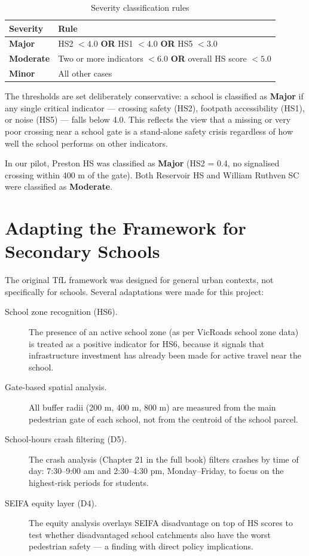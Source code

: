 \documentclass[11pt,a4paper,openany]{book}
\begin{document}
\begin{table}[H]
\centering
\caption{Severity classification rules}
\begin{tabular}{L{2.5cm}L{9cm}}
\toprule
\textbf{Severity} & \textbf{Rule} \\
\midrule
\textbf{Major} & HS2 $< 4.0$ \textbf{OR} HS1 $< 4.0$ \textbf{OR} HS5 $< 3.0$ \\
\textbf{Moderate} & Two or more indicators $< 6.0$ \textbf{OR} overall HS score $< 5.0$ \\
\textbf{Minor} & All other cases \\
\bottomrule
\end{tabular}
\end{table}

The thresholds are set deliberately conservative: a school is classified as \textbf{Major} if any single critical indicator --- crossing safety (HS2), footpath accessibility (HS1), or noise (HS5) --- falls below 4.0. This reflects the view that a missing or very poor crossing near a school gate is a stand-alone safety crisis regardless of how well the school performs on other indicators.

In our pilot, Preston HS was classified as \textbf{Major} (HS2 = 0.4, no signalised crossing within 400 m of the gate). Both Reservoir HS and William Ruthven SC were classified as \textbf{Moderate}.

\section{Adapting the Framework for Secondary Schools}

The original TfL framework was designed for general urban contexts, not specifically for schools. Several adaptations were made for this project:

\begin{description}
  \item[School zone recognition (HS6).]
    The presence of an active school zone (as per VicRoads school zone data) is treated as a positive indicator for HS6, because it signals that infrastructure investment has already been made for active travel near the school.
  \item[Gate-based spatial analysis.]
    All buffer radii (200 m, 400 m, 800 m) are measured from the main pedestrian gate of each school, not from the centroid of the school parcel.
  \item[School-hours crash filtering (D5).]
    The crash analysis (Chapter 21 in the full book) filters crashes by time of day: 7:30--9:00 am and 2:30--4:30 pm, Monday--Friday, to focus on the highest-risk periods for students.
  \item[SEIFA equity layer (D4).]
    The equity analysis overlays SEIFA disadvantage on top of HS scores to test whether disadvantaged school catchments also have the worst pedestrian safety --- a finding with direct policy implications.
\end{description}
\end{document}
